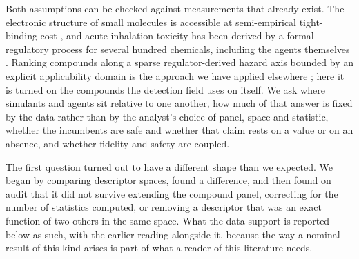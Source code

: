 \documentclass[1p,times]{elsarticle}
\begin{document}
Both assumptions can be checked against measurements that already exist. The
electronic structure of small molecules is accessible at semi-empirical
tight-binding cost \cite{gfnxtb2017,bannwarth2019,xtbreview2021}, and acute
inhalation toxicity has been derived by a formal regulatory process for several
hundred chemicals, including the agents themselves \cite{watson2006}. Ranking
compounds along a sparse regulator-derived hazard axis bounded by an explicit
applicability domain is the approach we have applied elsewhere \cite{dbpcarto};
here it is turned on the compounds the detection field uses on itself. We ask
where simulants and agents sit relative to one another, how much of that answer
is fixed by the data rather than by the analyst's choice of panel, space and
statistic, whether the incumbents are safe and whether that claim rests on a
value or on an absence, and whether fidelity and safety are coupled.

The first question turned out to have a different shape than we expected. We
began by comparing descriptor spaces, found a difference, and then found on
audit that it did not survive extending the compound panel, correcting for the
number of statistics computed, or removing a descriptor that was an exact
function of two others in the same space. What the data support is reported
below as such, with the earlier reading alongside it, because the way a nominal
result of this kind arises is part of what a reader of this literature needs.
\end{document}
